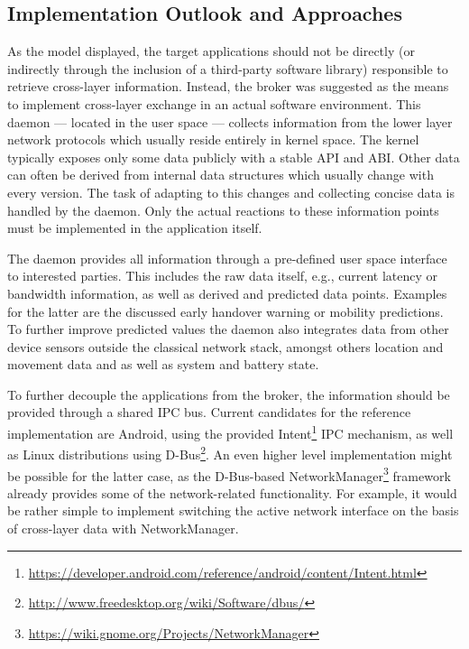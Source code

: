 \subsection{Implementation Outlook and Approaches}

As the model displayed, the target applications should not be directly (or indirectly through the inclusion of a third-party software library) responsible to retrieve cross-layer information. Instead, the broker was suggested as the means to implement cross-layer exchange in an actual software environment. This daemon --- located in the user space --- collects information from the lower layer network protocols which usually reside entirely in kernel space. The kernel typically exposes only some data publicly with a stable \gls{API} and \gls{ABI}. Other data can often be derived from internal data structures which usually change with every version. The task of adapting to this changes and collecting concise data is handled by the daemon. Only the actual reactions to these information points must be implemented in the application itself.

The daemon provides all information through a pre-defined user space interface to interested parties. This includes the raw data itself, e.g., current latency or bandwidth information, as well as derived and predicted data points. Examples for the latter are the discussed early handover warning or mobility predictions. To further improve predicted values the daemon also integrates data from other device sensors outside the classical network stack, amongst others location and movement data and as well as system and battery state.

To further decouple the applications from the broker, the information should be provided through a shared \gls{IPC} bus. Current candidates for the reference implementation are Android, using the provided Intent\footnote{\url{https://developer.android.com/reference/android/content/Intent.html}} \gls{IPC} mechanism, as well as Linux distributions using D-Bus\footnote{\url{http://www.freedesktop.org/wiki/Software/dbus/}}. An even higher level implementation might be possible for the latter case, as the D-Bus-based NetworkManager\footnote{\url{https://wiki.gnome.org/Projects/NetworkManager}} framework already provides some of the network-related functionality. For example, it would be rather simple to implement switching the active network interface on the basis of cross-layer data with NetworkManager.

